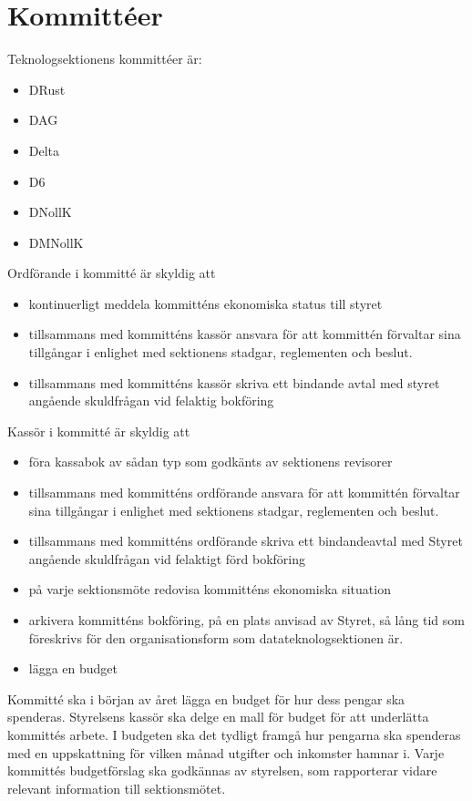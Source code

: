 \documentclass[a4paper]{dteklag}
\begin{document}
\section{Kommittéer}
\para Teknologsektionens kommittéer är:
\begin{itemize}
  \item DRust
  \item DAG
  \item Delta
  \item D6
  \item DNollK
  \item DMNollK
\end{itemize}
\para Ordförande i kommitté är skyldig att
\begin{itemize}
  \item kontinuerligt meddela kommitténs ekonomiska status till styret
  \item tillsammans med kommitténs kassör ansvara för att kommittén förvaltar sina tillgångar i enlighet med sektionens stadgar, reglementen och beslut.
  \item tillsammans med kommitténs kassör skriva ett bindande avtal med styret angående skuldfrågan vid felaktig bokföring
\end{itemize}
\para Kassör i kommitté är skyldig att
\begin{itemize}
  \item föra kassabok av sådan typ som godkänts av sektionens revisorer
  \item tillsammans med kommitténs ordförande ansvara för att kommittén förvaltar sina tillgångar i enlighet med sektionens stadgar, reglementen och beslut.
  \item tillsammans med kommitténs ordförande skriva ett bindandeavtal med Styret angående skuldfrågan vid felaktigt förd bokföring
  \item på varje sektionsmöte redovisa kommitténs ekonomiska situation
  \item arkivera kommitténs bokföring, på en plats anvisad av Styret, så lång tid som föreskrivs för den organisationsform som datateknologsektionen är.
  \item lägga en budget
\end{itemize}
\para Kommitté ska i början av året lägga en budget för hur dess pengar ska spenderas.
\stycke Styrelsens kassör ska delge en mall för budget för att underlätta kommittés arbete.
\stycke I budgeten ska det tydligt framgå hur pengarna ska spenderas med en uppskattning för vilken månad utgifter och inkomster hamnar i.
\para Varje kommittés budgetförslag ska godkännas av styrelsen, som rapporterar vidare relevant information till sektionsmötet.
\end{document}
